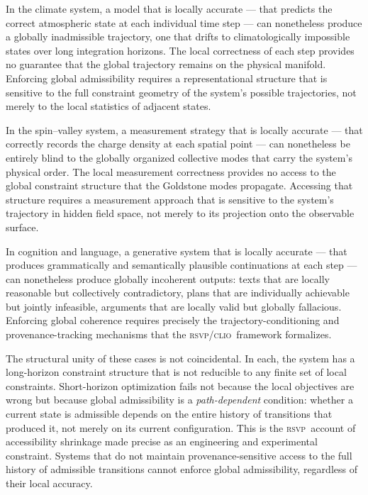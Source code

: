 \documentclass[11pt,a4paper]{article}
\theoremstyle{plain}
\theoremstyle{definition}
\theoremstyle{remark}
\newcommand{\RSVP}{\textup{\textsc{rsvp}}}
\newcommand{\CLIO}{\textup{\textsc{clio}}}
\begin{document}
In the climate system, a model that is locally accurate --- that predicts
the correct atmospheric state at each individual time step --- can
nonetheless produce a globally inadmissible trajectory, one that drifts to
climatologically impossible states over long integration horizons. The
local correctness of each step provides no guarantee that the global
trajectory remains on the physical manifold. Enforcing global admissibility
requires a representational structure that is sensitive to the full
constraint geometry of the system's possible trajectories, not merely to
the local statistics of adjacent states.

In the spin--valley system, a measurement strategy that is locally accurate
--- that correctly records the charge density at each spatial point --- can
nonetheless be entirely blind to the globally organized collective modes
that carry the system's physical order. The local measurement correctness
provides no access to the global constraint structure that the Goldstone
modes propagate. Accessing that structure requires a measurement approach
that is sensitive to the system's trajectory in hidden field space, not
merely to its projection onto the observable surface.

In cognition and language, a generative system that is locally accurate ---
that produces grammatically and semantically plausible continuations at each
step --- can nonetheless produce globally incoherent outputs: texts that
are locally reasonable but collectively contradictory, plans that are
individually achievable but jointly infeasible, arguments that are locally
valid but globally fallacious. Enforcing global coherence requires precisely
the trajectory-conditioning and provenance-tracking mechanisms that the
\RSVP/\CLIO\ framework formalizes.

The structural unity of these cases is not coincidental. In each, the system
has a long-horizon constraint structure that is not reducible to any finite
set of local constraints. Short-horizon optimization fails not because the
local objectives are wrong but because global admissibility is a
\textit{path-dependent} condition: whether a current state is admissible
depends on the entire history of transitions that produced it, not merely
on its current configuration. This is the \RSVP\ account of accessibility
shrinkage made precise as an engineering and experimental constraint.
Systems that do not maintain provenance-sensitive access to the full
history of admissible transitions cannot enforce global admissibility,
regardless of their local accuracy.
\end{document}
